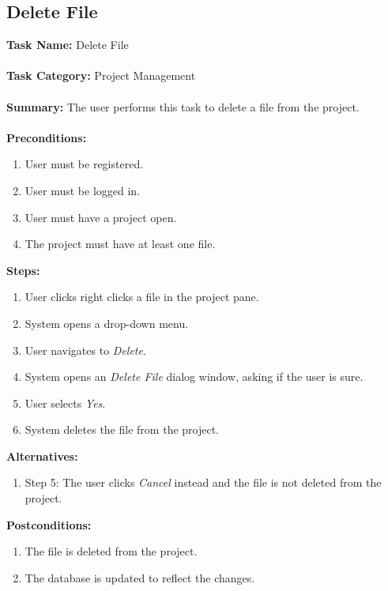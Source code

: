 \documentclass[14pt, a4paper]{article}
\begin{document}
\newpage

\subsection{Delete File}

\begin{framed}
	\noindent\textbf{Task Name:} Delete File \\ \\
	\textbf{Task Category:} Project Management \\ \\
	\textbf{Summary:} The user performs this task to delete a file from the project. \\ \\
	\textbf{Preconditions:} 
	\begin{enumerate}
		\item User must be registered.
		\item User must be logged in.
		\item User must have a project open.
		\item The project must have at least one file.
	\end{enumerate}
	\textbf{Steps:}
	\begin{enumerate}
		\item User clicks right clicks a file in the project pane.
		\item System opens a drop-down menu.
		\item User navigates to \textit{Delete}.
		\item System opens an \textit{Delete File} dialog window, asking if the user is sure.
		\item User selects \textit{Yes}.
		\item System deletes the file from the project.
	\end{enumerate}
	\textbf{Alternatives:} 
	\begin{enumerate}
		\item Step 5: The user clicks \textit{Cancel} instead and the file is not deleted from the project.
	\end{enumerate}
	\textbf{Postconditions:}
	\begin{enumerate}
		\item The file is deleted from the project.
		\item The database is updated to reflect the changes.
	\end{enumerate}
\end{framed} 
\end{document}
